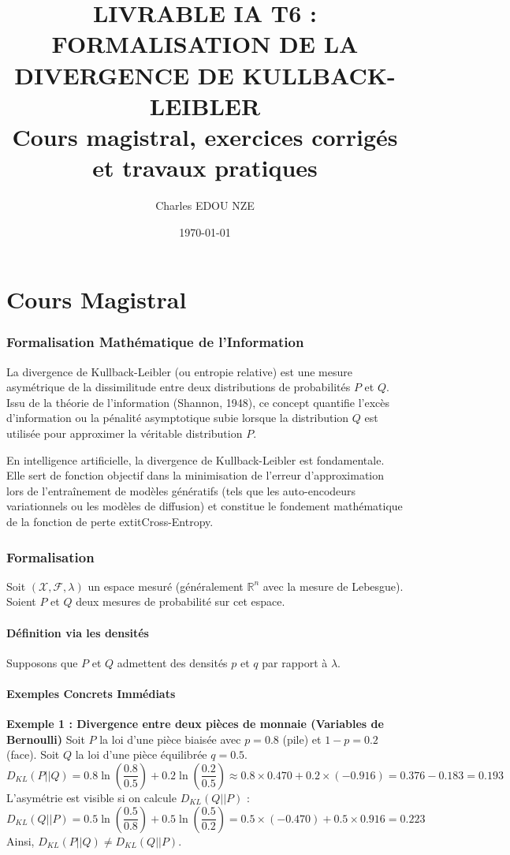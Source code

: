\documentclass[11pt,a4paper]{article}
\title{\Huge LIVRABLE IA T6 : FORMALISATION DE LA DIVERGENCE DE KULLBACK-LEIBLER \\ \large Cours magistral, exercices corrigés et travaux pratiques}
\author{\Large Charles EDOU NZE}
\date{\today}
\begin{document}
\maketitle
\tableofcontents
\newpage
\part{Cours Magistral}




\section{Formalisation Mathématique de l'Information}

La divergence de Kullback-Leibler (ou entropie relative) est une mesure asymétrique de la dissimilitude entre deux distributions de probabilités $P$ et $Q$. Issu de la théorie de l'information (Shannon, 1948), ce concept quantifie l'excès d'information ou la pénalité asymptotique subie lorsque la distribution $Q$ est utilisée pour approximer la véritable distribution $P$.

En intelligence artificielle, la divergence de Kullback-Leibler est fondamentale. Elle sert de fonction objectif dans la minimisation de l'erreur d'approximation lors de l'entraînement de modèles génératifs (tels que les auto-encodeurs variationnels ou les modèles de diffusion) et constitue le fondement mathématique de la fonction de perte 	extit{Cross-Entropy}.

\section{Formalisation}

Soit $(\mathcal{X}, \mathcal{F}, \lambda)$ un espace mesuré (généralement $\mathbb{R}^n$ avec la mesure de Lebesgue). Soient $P$ et $Q$ deux mesures de probabilité sur cet espace.

\subsection{Définition via les densités}

Supposons que $P$ et $Q$ admettent des densités $p$ et $q$ par rapport à $\lambda$.


\subsection{Exemples Concrets Immédiats}

\textbf{Exemple 1 : Divergence entre deux pièces de monnaie (Variables de Bernoulli)}
Soit $P$ la loi d'une pièce biaisée avec $p=0.8$ (pile) et $1-p=0.2$ (face). Soit $Q$ la loi d'une pièce équilibrée $q=0.5$.
$$ D_{KL}(P || Q) = 0.8 \ln\left(\frac{0.8}{0.5}\right) + 0.2 \ln\left(\frac{0.2}{0.5}\right) \approx 0.8 \times 0.470 + 0.2 \times (-0.916) = 0.376 - 0.183 = 0.193 $$
L'asymétrie est visible si on calcule $D_{KL}(Q || P)$ :
$$ D_{KL}(Q || P) = 0.5 \ln\left(\frac{0.5}{0.8}\right) + 0.5 \ln\left(\frac{0.5}{0.2}\right) = 0.5 \times (-0.470) + 0.5 \times 0.916 = 0.223 $$
Ainsi, $D_{KL}(P || Q) \neq D_{KL}(Q || P)$.
\end{document}
